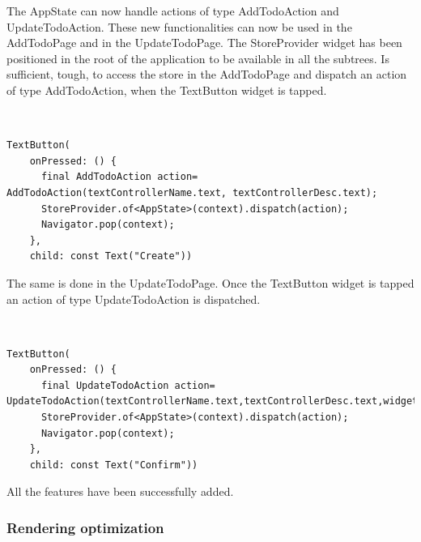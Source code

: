 The AppState can now handle actions of type AddTodoAction and UpdateTodoAction. These new functionalities can now be used in the AddTodoPage and in the UpdateTodoPage. The StoreProvider widget has been positioned in the root of the application to be available in all the subtrees. Is sufficient, tough, to access the store in the AddTodoPage and dispatch an action of type AddTodoAction, when the TextButton widget is tapped.
\begin{code}
\mbox{}\\
 \mbox{}
		\label{code:2.14}
\begin{verbatim}
TextButton(
    onPressed: () {
      final AddTodoAction action= AddTodoAction(textControllerName.text, textControllerDesc.text);
      StoreProvider.of<AppState>(context).dispatch(action);
      Navigator.pop(context);
    },
    child: const Text("Create"))
\end{verbatim}
\mbox{}
\end{code}

The same is done in the UpdateTodoPage. Once the TextButton widget is tapped an action of type UpdateTodoAction is dispatched.
\begin{code}
\mbox{}\\
 \mbox{}
		\label{code:2.14}
\begin{verbatim}
TextButton(
    onPressed: () {
      final UpdateTodoAction action= UpdateTodoAction(textControllerName.text,textControllerDesc.text,widget.todo.id);
      StoreProvider.of<AppState>(context).dispatch(action);
      Navigator.pop(context);
    },
    child: const Text("Confirm"))
\end{verbatim}
\mbox{}
\end{code}

All the features have been successfully added.
\subsubsection{Rendering optimization}  \label{par:todo_app_inherited_widget_introduction}

